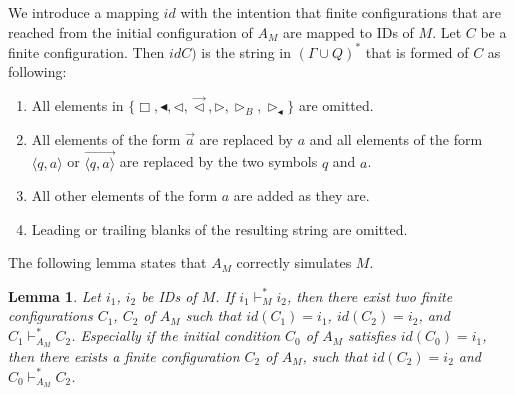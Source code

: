 \documentclass[pre,amssymb,showpacs,showkeys,preprint]{revtex4}
\newtheorem{lemma}{Lemma}
\begin{document}
We introduce a mapping $\mathit{id}$ with the intention that finite configurations that are reached from the
initial configuration of $A_M$ are mapped to IDs of $M$.
Let $C$ be a finite configuration.
Then $\mathit  {id}C)$ is the string in $(\Gamma \cup Q)^{*}$ that is formed of $C$ as following:
\begin{enumerate}
\item All elements in $\{\Box, \blacktriangleleft, \lhd, \vec{\lhd}, \rhd, \rhd_B, \rhd_\blacktriangleleft\}$ are omitted.
\item All elements of the form $\overrightarrow{a}$ are replaced by $a$ and all elements of the form
$\langle q,a  \rangle$ or $\overrightarrow{\langle q,a  \rangle}$ are replaced by the two symbols $q$ and $a$.
\item All other elements of the form $a$ are added as they are.
\item Leading or trailing blanks of the resulting string are omitted.
\end{enumerate}
The following lemma states that $A_M$ correctly simulates $M$.
\begin{lemma}
Let $i_1$, $i_2$ be IDs of $M$.
If $i_1 \vdash_M^* i_2$, then there exist two finite configurations $C_1$, $C_2$ of $A_M$
such that $\mathit{id}(C_1) = i_1$, $\mathit{id}(C_2) = i_2$, and $C_1 \vdash_{A_M}^* C_2$.
Especially if the initial condition $C_0$ of $A_M$ satisfies  $\mathit{id}(C_0) = i_1$,
then there exists a finite configuration $C_2$ of $A_M$, such that $\mathit{id}(C_2) = i_2$
 and $C_0 \vdash_{A_M}^* C_2$.
\end{lemma}
\end{document}
